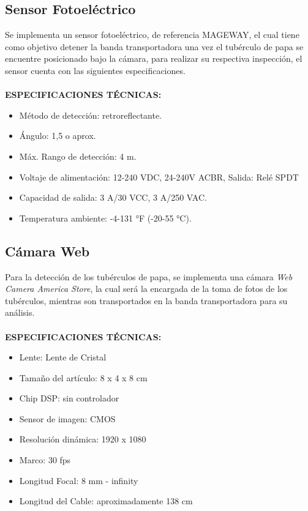 		\subsection{Sensor Fotoeléctrico}
			Se implementa un sensor fotoeléctrico, de referencia MAGEWAY, el cual tiene como objetivo detener la banda transportadora una vez el tubérculo de papa se encuentre posicionado bajo la cámara, para realizar su respectiva inspección, el sensor cuenta con las siguientes especificaciones.
			\\
			\\
			\textbf{ESPECIFICACIONES TÉCNICAS:}
				\begin{itemize}
					\item Método de detección: retroreflectante.
					\item Ángulo: 1,5 o aprox.
					\item Máx. Rango de detección: 4 m.
					\item Voltaje de alimentación: 12-240 VDC, 24-240V ACBR, Salida: Relé SPDT
					\item Capacidad de salida: 3 A/30 VCC, 3 A/250 VAC.
					\item Temperatura ambiente: -4-131 °F (-20-55 °C).
				\end{itemize}
			
		\subsection{Cámara Web}
			Para la detección de los tubérculos de papa, se implementa una cámara \textit{Web Camera America Store}, la cual será la encargada de la toma de fotos de los tubérculos, mientras son transportados en la banda transportadora para su análisis.
			\\
			\\
			\textbf{ESPECIFICACIONES TÉCNICAS:}
			\begin{itemize}
				\item Lente: Lente de Cristal
				\item Tamaño del artículo: 8 x 4 x 8 cm
				\item Chip DSP: sin controlador
				\item Sensor de imagen: CMOS
				\item Resolución dinámica: 1920 x 1080
				\item Marco: 30 fps
				\item Longitud Focal: 8 mm - infinity
				\item Longitud del Cable: aproximadamente 138 cm
			\end{itemize}
			
